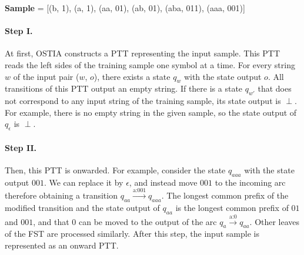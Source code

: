 \textbf{Sample} = {[}(b, 1), (a, 1), (aa, 01), (ab, 01), (aba, 011), (aaa, 001){]}


\paragraph{Step I.}

At first, OSTIA constructs a PTT representing the input sample.
This PTT reads the left sides of the training sample one symbol at a time.
For every string $w$ of the input pair ($w$, $o$), there exists a state $q_w$ with the state output $o$.
All transitions of this PTT output an empty string.
If there is a state $q_{w'}$ that does not correspond to any input string of the training sample, its state output is $\perp$.
For example, there is no empty string in the given sample, so the state output of $q_\epsilon$ is $\perp$.

\begin{center}
\end{center}

\paragraph{Step II.}

Then, this PTT is onwarded.
For example, consider the state $q_{aaa}$ with the state output $001$.
We can replace it by $\epsilon$, and instead move $001$ to the incoming arc therefore obtaining a transition $q_{aa}\xrightarrow{\text{a:001}}q_{aaa}$.
The longest common prefix of the modified transition and the state output of $q_{aa}$ is the longest common prefix of $01$ and $001$, and that $0$ can be moved to the output of the arc $q_{a}\xrightarrow{\text{a:0}}q_{aa}$.
Other leaves of the FST are processed similarly.
After this step, the input sample is represented as an onward PTT.

